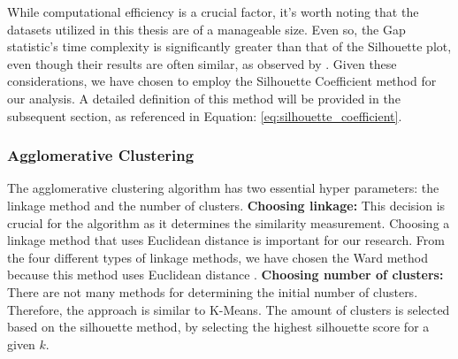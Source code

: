 While computational efficiency is a crucial factor, it's worth noting that the datasets utilized in this thesis are of a manageable size. 
Even so, the Gap statistic's time complexity is significantly greater than that of the Silhouette plot, even though their results are often similar, as observed by \citep{yuan_research_2019}. 
Given these considerations, we have chosen to employ the Silhouette Coefficient method for our analysis. A detailed definition of this method will be provided in the subsequent section, as referenced in Equation: \ref{eq:silhouette_coefficient}.

\subsubsection{Agglomerative Clustering} \label{theory:clustering-agglomerative}
The agglomerative clustering algorithm has two essential hyper parameters: the linkage method and the number of clusters. \newline
\textbf{Choosing linkage:}
This decision is crucial for the algorithm as it determines the similarity measurement.
Choosing a linkage method that uses Euclidean distance is important for our research.
From the four different types of linkage methods, we have chosen the Ward method because this method uses Euclidean distance \citep{roux_comparative_2015,seetharaman_brief_2019}. \newline
\textbf{Choosing number of clusters:}
There are not many methods for determining the initial number of clusters.
Therefore, the approach is similar to K-Means.
The amount of clusters is selected based on the silhouette method, by selecting the highest silhouette score for a given $k$.

